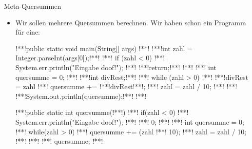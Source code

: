 {
\begin{frame}[fragile]{Meta-Quersummen}
\begin{itemize}[<+(1)->]
    \item<2-> Wir sollen mehrere Quersummen berechnen. Wir haben schon ein Programm für eine:\vfill{}
\columns[onlytextwidth,c]
\begin{plainjava}
!**!public static void main(String[] args) {
!**!   !**!int zahl = Integer.parseInt(args[0]);!**!
!**!   if (zahl < 0) {
!**!      System.err.println("Eingabe doof!");
!**!      !**!return;!**!
!**!   }
!**!   int quersumme = 0;
!**!   !**!int divRest;!**!
!**!   while (zahl > 0) {
!**!      !**!divRest = zahl %
!**!      quersumme += !**!divRest!**!;
!**!      zahl = zahl / 10;
!**!   }
!**!   !**!System.out.println(quersumme);!**!
!**!}
\end{plainjava}
\column{0pt}
\clap{$\to$}
\makeatletter
\begin{plainjava}
!**!public static int quersumme(!**!) {
!**!    if(zahl < 0){
!**!        System.err.println("Eingabe doof!");
!**!        !**! 0;
!**!    }
!**!    int quersumme = 0;
!**!    while(zahl > 0){
!**!        quersumme += (zahl !**! 10);
!**!        zahl = zahl / 10;
!**!    }
!**!    !**! quersumme;
!**!}
\end{plainjava}
\endcolumns
\end{itemize}
\end{frame}}
